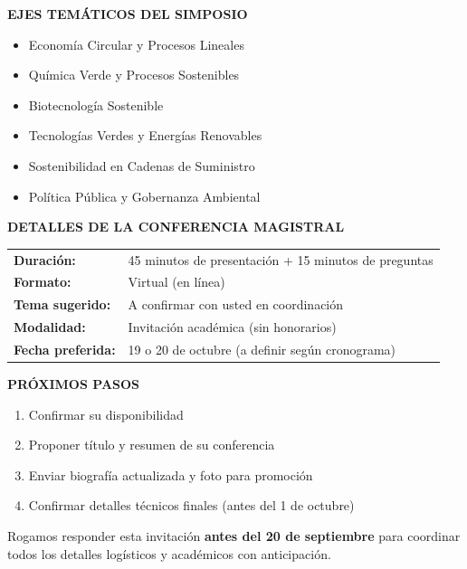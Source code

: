 \documentclass[12pt,a4paper]{article}
\begin{document}
\vspace{0.5cm}

\noindent
\textbf{EJES TEMÁTICOS DEL SIMPOSIO}

\begin{itemize}
  \item Economía Circular y Procesos Lineales
  \item Química Verde y Procesos Sostenibles
  \item Biotecnología Sostenible
  \item Tecnologías Verdes y Energías Renovables
  \item Sostenibilidad en Cadenas de Suministro
  \item Política Pública y Gobernanza Ambiental
\end{itemize}

\vspace{0.5cm}

\noindent
\textbf{DETALLES DE LA CONFERENCIA MAGISTRAL}

\begin{tabular}{ll}
\textbf{Duración:} & 45 minutos de presentación + 15 minutos de preguntas \\
\textbf{Formato:} & Virtual (en línea) \\
\textbf{Tema sugerido:} & A confirmar con usted en coordinación \\
\textbf{Modalidad:} & Invitación académica (sin honorarios) \\
\textbf{Fecha preferida:} & 19 o 20 de octubre (a definir según cronograma) \\
\end{tabular}

\vspace{0.5cm}

\noindent
\textbf{PRÓXIMOS PASOS}

\begin{enumerate}
  \item Confirmar su disponibilidad
  \item Proponer título y resumen de su conferencia
  \item Enviar biografía actualizada y foto para promoción
  \item Confirmar detalles técnicos finales (antes del 1 de octubre)
\end{enumerate}

\vspace{0.8cm}

Rogamos responder esta invitación \textbf{antes del 20 de septiembre} para coordinar todos los detalles logísticos y académicos con anticipación.
\end{document}
